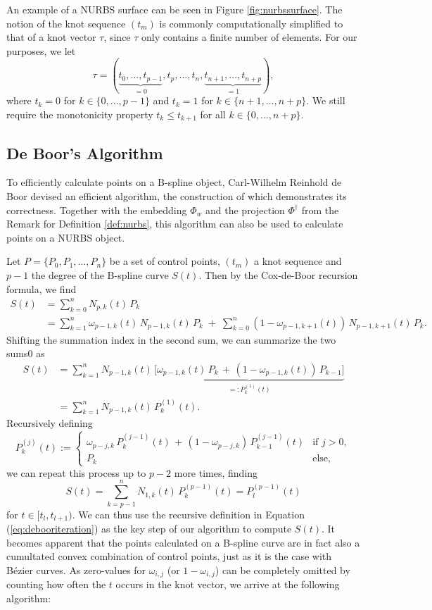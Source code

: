 \documentclass[a4paper, 11pt]{report}
\theoremstyle{definition}
\begin{document}
	An example of a NURBS surface can be seen in Figure \ref{fig:nurbssurface}. The notion of the knot sequence $(t_m)$ is commonly computationally simplified to that of a knot vector $\tau$, since $\tau$ only contains a finite number of elements. For our purposes, we let
		$$\tau = (\underbrace {t_0, ..., t_{p-1}}_{= 0}, t_p, ..., t_n, \underbrace{t_{n+1}, ..., t_{n+p}}_{= 1}),$$
	where $t_k = 0$ for $k \in \{0,...,p-1\}$ and $t_k = 1$ for $k \in \{n+1, ..., n+p\}$. We still require the monotonicity property $t_k \leq t_{k+1}$ for all $k \in \{0, ..., n+p\}$.

\subsection{De Boor's Algorithm}
	To efficiently calculate points on a B-spline object, Carl-Wilhelm Reinhold de Boor devised an efficient algorithm, the construction of which demonstrates its correctness. Together with the embedding $\Phi_w$ and the projection $\Phi^\dagger$ from the Remark for Definition \ref{def:nurbs}, this algorithm can also be used to calculate points on a NURBS object.

	Let $P = \{P_0, P_1, ..., P_n\}$ be a set of control points, $(t_m)$ a knot sequence and $p-1$ the degree of the B-spline curve $S(t)$. Then by the Cox-de-Boor recursion formula, we find
	\begin{align*}
		S(t) 	&= \sum_{k=0}^n N_{p,k}(t) \, P_k \\
				&= \sum_{k=1}^n \omega_{p-1,k}(t) \, N_{p-1, k}(t) \, P_k  \; + \; \sum_{k=0}^n \left( 1-\omega_{p-1,k+1}(t) \right) \, N_{p-1, k+1}(t) \, P_k.
	\end{align*}
	Shifting the summation index in the second sum, we can summarize the two sums0 as
	\begin{align*} 
		S(t) 	&= \sum_{k=1}^n N_{p-1, k}(t) \, \underbrace{\Big[ \omega_{p-1,k}(t) \, P_k  \, + \, \left( 1-\omega_{p-1,k}(t) \right) \, P_{k-1} \Big]}_{=: P_k^{(1)}(t)} \\
				&= \sum_{k=1}^n N_{p-1, k}(t) \, P_k^{(1)}(t).
	\end{align*}
	Recursively defining
	\begin{equation}\label{eq:debooriteration}
		P^{(j)}_k(t) := \begin{cases}
			\omega_{p-j, k} \, P^{(j-1)}_k(t) \, + \, (1-\omega_{p-j, k}) \, P^{(j-1)}_{k-1}(t) 	&\text{if } j > 0,\\
			P_k 																					&\text{else},
		\end{cases}
	\end{equation}
	we can repeat this process up to $p-2$ more times, finding
	$$ S(t) = \sum_{k=p-1}^n N_{1, k}(t) \, P^{(p-1)}_k(t) = P^{(p-1)}_l(t)$$
	for $t \in [t_l, t_{l+1})$. We can thus use the recursive definition in Equation (\ref{eq:debooriteration}) as the key step of our algorithm to compute $S(t)$. It becomes apparent that the points calculated on a B-spline curve are in fact also a cumultated convex combination of control points, just as it is the case with Bézier curves. As zero-values for $\omega_{i,j}$ (or $1-\omega_{i,j}$) can be completely omitted by counting how often the $t$ occurs in the knot vector, we arrive at the following algorithm:
\end{document}
